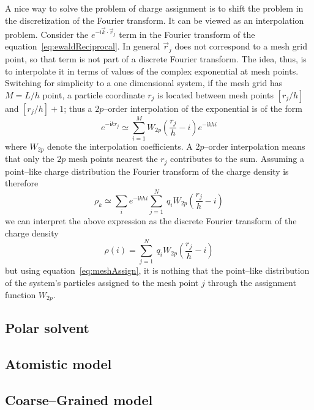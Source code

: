 A nice way to solve the problem of charge assignment is to shift the problem in the discretization of the Fourier transform. It can be viewed as an interpolation problem. Consider the $e^{-\mathsf{i}\vec k\cdot \vec r_j}$ term in the Fourier transform of the equation~\eqref{eq:ewaldReciprocal}. In general $\vec r_j$ does not correspond to a mesh grid point, so that term is not part of a discrete Fourier transform. The idea, thus, is to interpolate it in terms of values of the complex exponential at mesh points. Switching for simplicity to a one dimensional system, if the mesh grid has $M = L/h$ point, a particle coordinate $r_j$ is located between mesh points $[r_j/h]$ and $[r_j/h] + 1$; thus a $2p$--order interpolation of the exponential is of the form
\begin{equation*}
	e^{-\mathsf{i}kr_j} \simeq \sum_{i=1}^M W_{2p}\left ( \frac{r_j}{h} - i \right ) e^{-\mathsf{i}khi}
\end{equation*}
where $W_{2p}$ denote the interpolation coefficients. A $2p$--order interpolation means that only the $2p$ mesh points nearest the $r_j$ contributes to the sum. Assuming a point--like charge distribution the Fourier transform of the charge density is therefore
\begin{equation*}
	\rho_k \simeq \sum_{i}e^{-\mathsf{i}khi} \sum_{j=1}^N\ q_iW_{2p} \left ( \frac{r_j}{h} - i \right ) 
\end{equation*}
we can interpret the above expression as the discrete Fourier transform of the charge density
\begin{equation*}
	\rho(i) = \sum_{j=1}^N\ q_iW_{2p} \left ( \frac{r_j}{h} - i \right ) 
\end{equation*}
but using equation~\eqref{eq:meshAssign}, it is nothing that the point--like distribution of the system's particles assigned to the mesh point $j$ through the assignment function $W_{2p}$.


\subsection{Polar solvent}

\subsection{Atomistic model}
\subsection{Coarse--Grained model}

